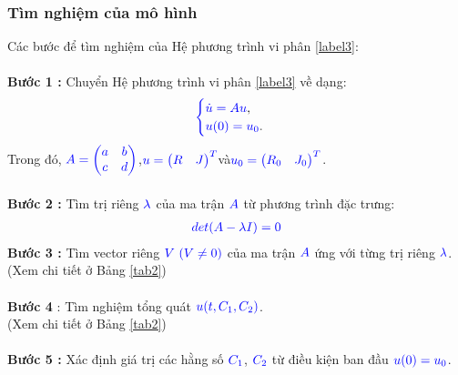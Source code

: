 \documentclass[a4paper]{article}
\begin{document}
        \subsubsection{Tìm nghiệm của mô hình}
    Các bước để tìm nghiệm của Hệ phương trình vi phân \eqref{label3}:\\\\
    {\bfseries Bước 1 :} Chuyển Hệ phương trình vi phân \eqref{label3} về dạng:
    \begin{align}
	    \textcolor{blue}{
	    \begin{cases}
            \dot u = Au \textcolor{black}{,}\\
            u(0) = u\sb{0}\textcolor{black}{.}
        \end{cases}
        }
        \label{label4}
	\end{align}
    Trong đó, $\textcolor{blue}{A = \begin{pmatrix} a & b\\ c & d \end{pmatrix}}$,\enskip $\textcolor{blue}{u = \begin{pmatrix} R & J \end{pmatrix}\sp{T}}$\enskip và\enskip $\textcolor{blue}{u\sb{0} = \begin{pmatrix} R\sb{0} & J\sb{0} \end{pmatrix}\sp{T}}$.\\\\
    {\bfseries Bước 2 :} Tìm trị riêng $\textcolor{blue}{\lambda}$ của ma trận $\textcolor{blue}{A}$ từ phương trình đặc trưng:
    \begin{align}
	    \textcolor{blue}{det(A - \lambda I) = 0}
        \label{label5}
	\end{align}
	{\bfseries Bước 3 :} Tìm vector riêng $\textcolor{blue}{V \ (V \neq 0)}$ của ma trận $\textcolor{blue}{A}$ ứng với từng trị riêng $\textcolor{blue}{\lambda}$.\\
	(Xem chi tiết ở Bảng \ref{tab2})\\\\
	{\bfseries Bước 4} : Tìm nghiệm tổng quát $\textcolor{blue}{u(t, C\sb{1}, C\sb{2})}$.\\ (Xem chi tiết ở Bảng \ref{tab2})\\\\
    {\bfseries Bước 5 :} Xác định giá trị các hằng số $\textcolor{blue}{C\sb{1}}$, $\textcolor{blue}{C\sb{2}}$ từ điều kiện ban đầu $\textcolor{blue}{u(0) = u\sb{0}}$.\\
    
\end{document}
